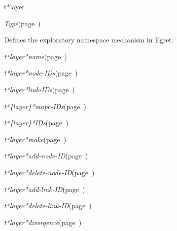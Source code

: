 \begin{description}
\item [Name:]  t*layer

\item [Layer:] {\sl Type}\hfill(page~\pageref{Type})

\item [Description:]

Defines the exploratory namespace mechanism in Egret.

\item [Attributes:]
\item {\sl t*layer*name}\hfill(page~\pageref{t*layer*name})
\item {\sl t*layer*node-IDs}\hfill(page~\pageref{t*layer*node-IDs})
\item {\sl t*layer*link-IDs}\hfill(page~\pageref{t*layer*link-IDs})

\item [Operations:]
\item {\sl t*\{layer\}*mapc-IDs}\hfill(page~\pageref{t*layer*mapc-IDs})
\item {\sl t*\{layer\}*IDs}\hfill(page~\pageref{t*layer*IDs})
\item {\sl t*layer*make}\hfill(page~\pageref{t*layer*make})
\item {\sl t*layer*add-node-ID}\hfill(page~\pageref{t*layer*add-node-ID})
\item {\sl t*layer*delete-node-ID}\hfill(page~\pageref{t*layer*delete-node-ID})
\item {\sl t*layer*add-link-ID}\hfill(page~\pageref{t*layer*add-link-ID})
\item {\sl t*layer*delete-link-ID}\hfill(page~\pageref{t*layer*delete-link-ID})
\item {\sl t*layer*divergence}\hfill(page~\pageref{t*layer*divergence})


\item [Subclasses:]


\item [Superclasses:]


\item [Instances:]
























\end{description}
\horizontalline

